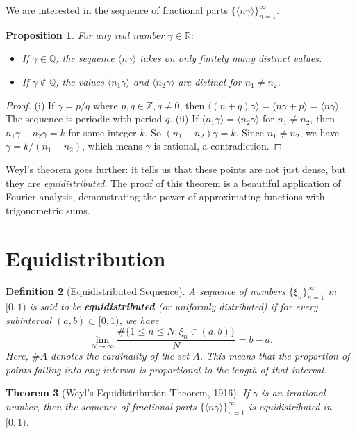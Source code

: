 \documentclass[12pt]{article}
\newtheorem{theorem}{Theorem}[section]
\newtheorem{definition}[theorem]{Definition}
\newtheorem{proposition}[theorem]{Proposition}
\newcommand{\R}{\mathbb{R}}
\newcommand{\Z}{\mathbb{Z}}
\newcommand{\Q}{\mathbb{Q}}
\begin{document}
We are interested in the sequence of fractional parts $\{\langle n\gamma \rangle\}_{n=1}^\infty$.
\begin{proposition}
For any real number $\gamma \in \R$:
\begin{itemize}
    \item If $\gamma \in \Q$, the sequence $\langle n\gamma \rangle$ takes on only finitely many distinct values.
    \item If $\gamma \notin \Q$, the values $\langle n_1\gamma \rangle$ and $\langle n_2\gamma \rangle$ are distinct for $n_1 \neq n_2$.
\end{itemize}
\end{proposition}
\begin{proof}
(i) If $\gamma = p/q$ where $p,q \in \Z, q \neq 0$, then $\langle (n+q)\gamma \rangle = \langle n\gamma + p \rangle = \langle n\gamma \rangle$. The sequence is periodic with period $q$.
(ii) If $\langle n_1\gamma \rangle = \langle n_2\gamma \rangle$ for $n_1 \neq n_2$, then $n_1\gamma - n_2\gamma = k$ for some integer $k$. So $(n_1-n_2)\gamma = k$. Since $n_1 \neq n_2$, we have $\gamma = k/(n_1-n_2)$, which means $\gamma$ is rational, a contradiction.
\end{proof}
Weyl's theorem goes further: it tells us that these points are not just dense, but they are \emph{equidistributed}. The proof of this theorem is a beautiful application of Fourier analysis, demonstrating the power of approximating functions with trigonometric sums.

\section{Equidistribution}

\begin{definition}[Equidistributed Sequence]
A sequence of numbers $\{\xi_n\}_{n=1}^\infty$ in $[0,1)$ is said to be \textbf{equidistributed} (or uniformly distributed) if for every subinterval $(a,b) \subset [0,1)$, we have
$$ \lim_{N\to\infty} \frac{\#\{1 \le n \le N : \xi_n \in (a,b)\}}{N} = b-a. $$
Here, $\#A$ denotes the cardinality of the set $A$.
This means that the proportion of points falling into any interval is proportional to the length of that interval.
\end{definition}

\begin{theorem}[Weyl's Equidistribution Theorem, 1916]
If $\gamma$ is an irrational number, then the sequence of fractional parts $\{\langle n\gamma \rangle\}_{n=1}^\infty$ is equidistributed in $[0,1)$.
\end{theorem}
\end{document}
